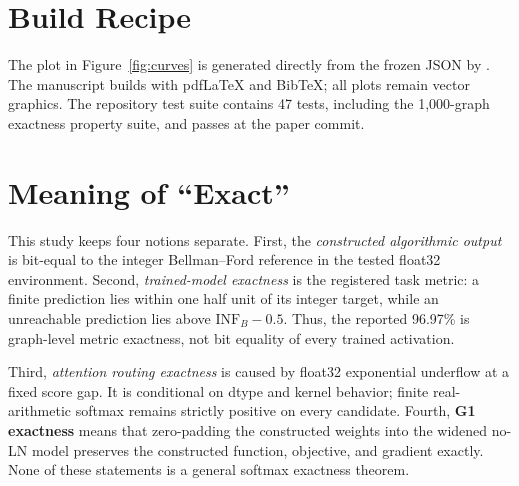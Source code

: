 \documentclass[10pt,twocolumn]{article}
\newcommand{\gparity}{\textsc{G1}}
\newcommand{\infb}{\mathrm{INF}_{B}}
\begin{document}
\section{Build Recipe}

The plot in Figure~\ref{fig:curves} is generated directly from the frozen JSON
by . The manuscript builds with pdfLaTeX and BibTeX;
all plots remain vector graphics. The repository test suite contains 47 tests,
including the 1,000-graph exactness property suite, and passes at the paper
commit.

\section{Meaning of ``Exact''}

This study keeps four notions separate. First, the \emph{constructed
algorithmic output} is bit-equal to the integer Bellman--Ford reference in the
tested float32 environment. Second, \emph{trained-model exactness} is the
registered task metric: a finite prediction lies within one half unit of its
integer target, while an unreachable prediction lies above
\(\infb-0.5\). Thus, the reported 96.97\% is graph-level metric exactness, not
bit equality of every trained activation.

Third, \emph{attention routing exactness} is caused by float32 exponential
underflow at a fixed score gap. It is conditional on dtype and kernel behavior;
finite real-arithmetic softmax remains strictly positive on every candidate.
Fourth, \textbf{\gparity{} exactness} means that zero-padding the constructed
weights into the widened no-LN model preserves the constructed function,
objective, and gradient exactly. None of these statements is a general
softmax exactness theorem.
\end{document}
